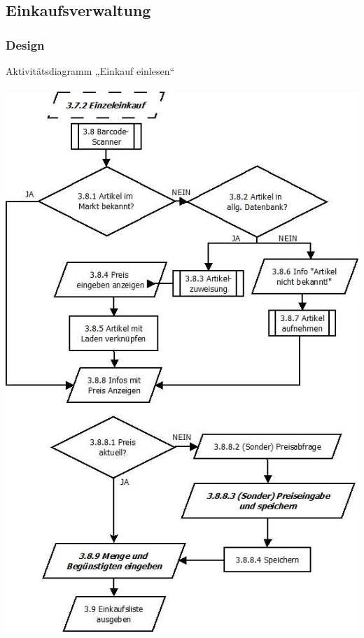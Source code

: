 \documentclass[12pt,a4paper]{article}
\begin{document}
\subsection{Einkaufsverwaltung}
\subsubsection*{Design}
Aktivitätsdiagramm „Einkauf einlesen“ 
\\
\\
\hspace*{-10mm} 
\includegraphics[scale=0.7]{Einzeleinkauf_Diagramm.jpg}
\end{document}
